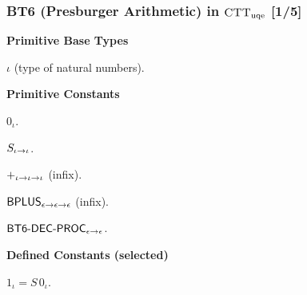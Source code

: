 \documentclass[t,12pt,numbers,fleqn]{beamer}
\newcommand{\churchuqe}{$\mbox{\sc CTT}_{\rm uqe}$}
\begin{document}
\begin{frame}
\frametitle{BT6 (Presburger Arithmetic) in {\churchuqe} [1/5]}
\small
\bi

  \item[] \textbf{Primitive Base Types}

  \be

    \item $\iota$ (type of natural numbers).

  \ee

  \item[] \textbf{Primitive Constants}

  \be

    \item $0_\iota$.

    \item $S_{\iota \rightarrow \iota}$.

    \item $+_{\iota \rightarrow \iota \rightarrow \iota}$ (infix).

    \item $\mbox{\sf BPLUS}_{\epsilon \rightarrow \epsilon \rightarrow \epsilon}$ (infix).

    \setcounter{enumi}{5}

    \item $\mbox{\sf BT6-DEC-PROC}_{\epsilon \rightarrow \epsilon}$.

  \ee

  \item[] \textbf{Defined Constants (selected)}

  \be

    \item $1_\iota = S \, 0_\iota$.

  \ee

\ei

\end{frame}

\end{document}
